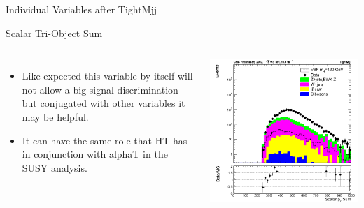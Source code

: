\documentclass[8pt]{beamer}
\begin{document}
\begin{frame}{Individual Variables after TightMjj}
 
\begin{block}{Scalar Tri-Object Sum}
 
\begin{columns}
 
\column[t]{5.5cm} 
\begin{itemize}
  \item Like expected this variable by itself will not allow a big signal discrimination but 
conjugated with other variables it may be helpful.
  \item It can have the same role that HT has in conjunction with alphaT in the SUSY analysis. 
\end{itemize}


\column[t]{5.5cm} 
  \begin{center}
  \includegraphics[width=1.00\textwidth]{img/htMET_2012_TightMjj_log.png}
  \end{center}
 
\end{columns}

\end{block}
 
\end{frame}
\end{document}
